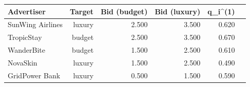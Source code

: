 \begin{tabular}{lrrrrr}
\hline
Advertiser & Target & Bid (budget) & Bid (luxury) & q_i^(1) \\
\hline
SunWing Airlines & luxury & 2.500 & 3.500 & 0.620 \\
TropicStay & budget & 2.500 & 3.500 & 0.670 \\
WanderBite & budget & 1.500 & 2.500 & 0.610 \\
NovaSkin & luxury & 1.500 & 2.500 & 0.490 \\
GridPower Bank & luxury & 0.500 & 1.500 & 0.590 \\
\hline
\end{tabular}
